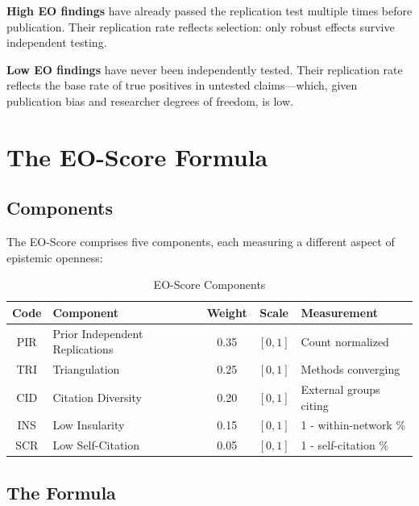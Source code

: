 \documentclass[11pt,a4paper]{article}
\begin{document}
\begin{empiricalbox}[title={Why Epistemic Openness Predicts Replication}]
\textbf{High EO findings} have already passed the replication test multiple times before publication. Their replication rate reflects selection: only robust effects survive independent testing.

\textbf{Low EO findings} have never been independently tested. Their replication rate reflects the base rate of true positives in untested claims---which, given publication bias and researcher degrees of freedom, is low.
\end{empiricalbox}


\section{The EO-Score Formula}
\label{sec:formula}

\subsection{Components}

The EO-Score comprises five components, each measuring a different aspect of epistemic openness:

\begin{table}[h]
\centering
\caption{EO-Score Components}
\label{tab:components}
\begin{tabular}{clccp{4cm}}
\toprule
\textbf{Code} & \textbf{Component} & \textbf{Weight} & \textbf{Scale} & \textbf{Measurement} \\
\midrule
PIR & Prior Independent Replications & 0.35 & $[0, 1]$ & Count normalized \\
TRI & Triangulation & 0.25 & $[0, 1]$ & Methods converging \\
CID & Citation Diversity & 0.20 & $[0, 1]$ & External groups citing \\
INS & Low Insularity & 0.15 & $[0, 1]$ & 1 - within-network \% \\
SCR & Low Self-Citation & 0.05 & $[0, 1]$ & 1 - self-citation \% \\
\bottomrule
\end{tabular}
\end{table}

\subsection{The Formula}
\end{document}
